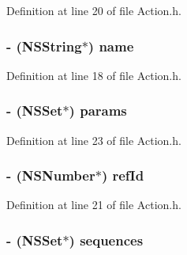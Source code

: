 Definition at line 20 of file Action.h.

\hypertarget{interface_action_a4b93d352d2fca75b34e1b5a50e03f587}{
\subsubsection[{name}]{\setlength{\rightskip}{0pt plus 5cm}-\/ (NSString$\ast$) name}}
\label{interface_action_a4b93d352d2fca75b34e1b5a50e03f587}


Definition at line 18 of file Action.h.

\hypertarget{interface_action_a0e40d62a824c738e0c18d38b114cb378}{
\subsubsection[{params}]{\setlength{\rightskip}{0pt plus 5cm}-\/ (NSSet$\ast$) params}}
\label{interface_action_a0e40d62a824c738e0c18d38b114cb378}


Definition at line 23 of file Action.h.

\hypertarget{interface_action_ae24e2568d0d3a40bebefe304cb92656c}{
\subsubsection[{refId}]{\setlength{\rightskip}{0pt plus 5cm}-\/ (NSNumber$\ast$) refId}}
\label{interface_action_ae24e2568d0d3a40bebefe304cb92656c}


Definition at line 21 of file Action.h.

\hypertarget{interface_action_a4cb3c561b838983ae43c00bf45aa2059}{
\subsubsection[{sequences}]{\setlength{\rightskip}{0pt plus 5cm}-\/ (NSSet$\ast$) sequences}}
\label{interface_action_a4cb3c561b838983ae43c00bf45aa2059}



